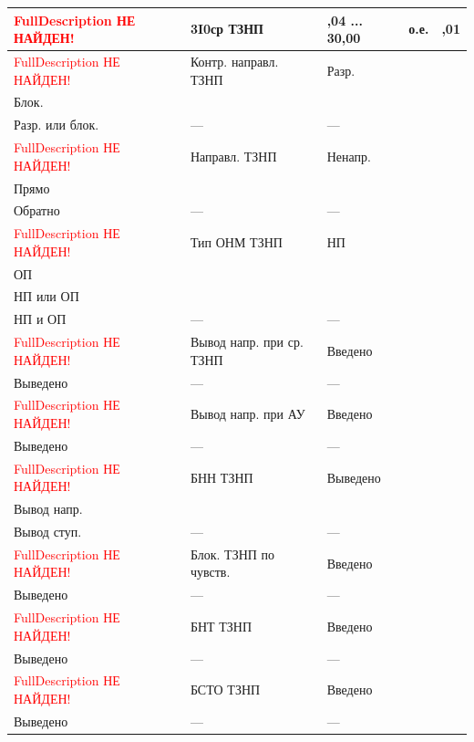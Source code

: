 \begin{longtable}{|>{\centering\arraybackslash}m{5.3cm}|>{\centering\arraybackslash}m{3.3cm}|>{\centering\arraybackslash}m{4.2cm}|>{\centering\arraybackslash}m{1.8cm}|>{\centering\arraybackslash}m{1cm}|}
\hline
\raggedright \textcolor{red}{FullDescription НЕ НАЙДЕН!} & \centering 3I0ср ТЗНП & \centering 0,04 ... 30,00 & \centering о.е. & \centering \arraybackslash 0,01 \\
\hline
\raggedright \textcolor{red}{FullDescription НЕ НАЙДЕН!} & \centering Контр. направл. ТЗНП & \centering Разр. \\ Блок. \\ Разр. или блок. & \centering --- & \centering \arraybackslash --- \\
\hline
\raggedright \textcolor{red}{FullDescription НЕ НАЙДЕН!} & \centering Направл. ТЗНП & \centering Ненапр. \\ Прямо \\ Обратно & \centering --- & \centering \arraybackslash --- \\
\hline
\raggedright \textcolor{red}{FullDescription НЕ НАЙДЕН!} & \centering Тип ОНМ ТЗНП & \centering НП \\ ОП \\ НП или ОП \\ НП и ОП & \centering --- & \centering \arraybackslash --- \\
\hline
\raggedright \textcolor{red}{FullDescription НЕ НАЙДЕН!} & \centering Вывод напр. при ср. ТЗНП & \centering Введено \\ Выведено & \centering --- & \centering \arraybackslash --- \\
\hline
\raggedright \textcolor{red}{FullDescription НЕ НАЙДЕН!} & \centering Вывод напр. при АУ & \centering Введено \\ Выведено & \centering --- & \centering \arraybackslash --- \\
\hline
\raggedright \textcolor{red}{FullDescription НЕ НАЙДЕН!} & \centering БНН ТЗНП & \centering Выведено \\ Вывод напр. \\ Вывод ступ. & \centering --- & \centering \arraybackslash --- \\
\hline
\raggedright \textcolor{red}{FullDescription НЕ НАЙДЕН!} & \centering Блок. ТЗНП по чувств. & \centering Введено \\ Выведено & \centering --- & \centering \arraybackslash --- \\
\hline
\raggedright \textcolor{red}{FullDescription НЕ НАЙДЕН!} & \centering БНТ ТЗНП & \centering Введено \\ Выведено & \centering --- & \centering \arraybackslash --- \\
\hline
\raggedright \textcolor{red}{FullDescription НЕ НАЙДЕН!} & \centering БСТО ТЗНП & \centering Введено \\ Выведено & \centering --- & \centering \arraybackslash --- \\

\end{longtable}
